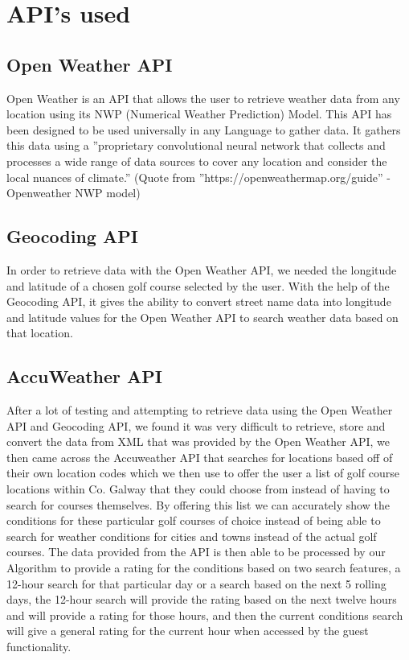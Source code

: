 \section{API's used}

\subsection{Open Weather API}
Open Weather is an API that allows the user to retrieve weather data from any location using its NWP (Numerical Weather Prediction) Model. This API has been designed to be used universally in any Language to gather data. It gathers this data using a ”proprietary convolutional neural network that collects and processes a wide range of data sources to cover any location and
consider the local nuances of climate.”
(Quote from ”https://openweathermap.org/guide” - Openweather NWP model)

\subsection{Geocoding API}
In order to retrieve data with the Open Weather API, we needed the longitude and latitude of a chosen golf course selected by the user. With the help of the Geocoding API, it gives the ability to convert street name data into longitude and latitude values for the Open Weather API to search weather data based on that location.

\subsection{AccuWeather API}
After a lot of testing and attempting to retrieve data using the Open Weather API and Geocoding API, we found it was very difficult to retrieve, store and convert the data from XML that was provided by the Open Weather API, we then came across the Accuweather API that searches for locations based off of their own location codes which we then use to offer the user a list of golf course locations within Co. Galway that they could choose from instead of having to search for courses themselves.
\newline
\newline
By offering this list we can accurately show the conditions for these particular golf courses of choice instead of being able to search for weather conditions for cities and towns instead of the actual golf courses.
\newline
\newline
The data provided from the API is then able to be processed by our Algorithm to provide a rating for the conditions based on two search features, a 12-hour search for that particular day or a search based on the next 5 rolling days, the 12-hour search will provide the rating based on the next twelve hours and will provide a rating for those hours, and then the current conditions search will give a general rating for the current hour when accessed by the guest functionality.

